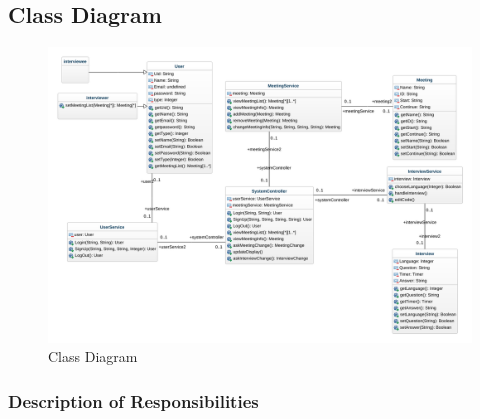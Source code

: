 \documentclass{article}
\begin{document}
\subsection{Class Diagram}

\begin{figure}[H]
  \center
  \includegraphics[scale=0.3]{diagrams/class-diagram.png}
  \caption{Class Diagram}
\end{figure}

\subsubsection*{Description of Responsibilities}
\end{document}
